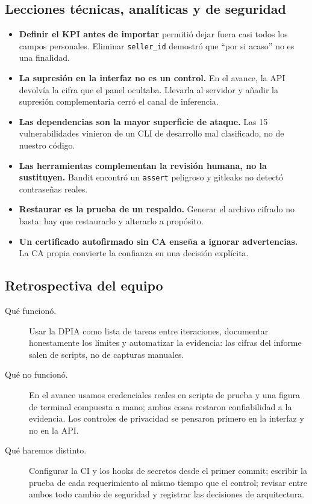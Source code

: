 \documentclass[12pt,a4paper]{article}
\begin{document}
\subsection{Lecciones técnicas, analíticas y de seguridad}
\begin{itemize}
\item \textbf{Definir el KPI antes de importar} permitió dejar fuera casi todos los campos personales. Eliminar \texttt{seller\_id} demostró que ``por si acaso'' no es una finalidad.
\item \textbf{La supresión en la interfaz no es un control.} En el avance, la API devolvía la cifra que el panel ocultaba. Llevarla al servidor y añadir la supresión complementaria cerró el canal de inferencia.
\item \textbf{Las dependencias son la mayor superficie de ataque.} Las 15 vulnerabilidades vinieron de un CLI de desarrollo mal clasificado, no de nuestro código.
\item \textbf{Las herramientas complementan la revisión humana, no la sustituyen.} Bandit encontró un \texttt{assert} peligroso y gitleaks no detectó contraseñas reales.
\item \textbf{Restaurar es la prueba de un respaldo.} Generar el archivo cifrado no basta: hay que restaurarlo y alterarlo a propósito.
\item \textbf{Un certificado autofirmado sin CA enseña a ignorar advertencias.} La CA propia convierte la confianza en una decisión explícita.
\end{itemize}

\subsection{Retrospectiva del equipo}
\begin{description}
\item[Qué funcionó.] Usar la DPIA como lista de tareas entre iteraciones, documentar honestamente los límites y automatizar la evidencia: las cifras del informe salen de scripts, no de capturas manuales.
\item[Qué no funcionó.] En el avance usamos credenciales reales en scripts de prueba y una figura de terminal compuesta a mano; ambas cosas restaron confiabilidad a la evidencia. Los controles de privacidad se pensaron primero en la interfaz y no en la API.
\item[Qué haremos distinto.] Configurar la CI y los hooks de secretos desde el primer commit; escribir la prueba de cada requerimiento al mismo tiempo que el control; revisar entre ambos todo cambio de seguridad y registrar las decisiones de arquitectura.
\end{description}
\end{document}
